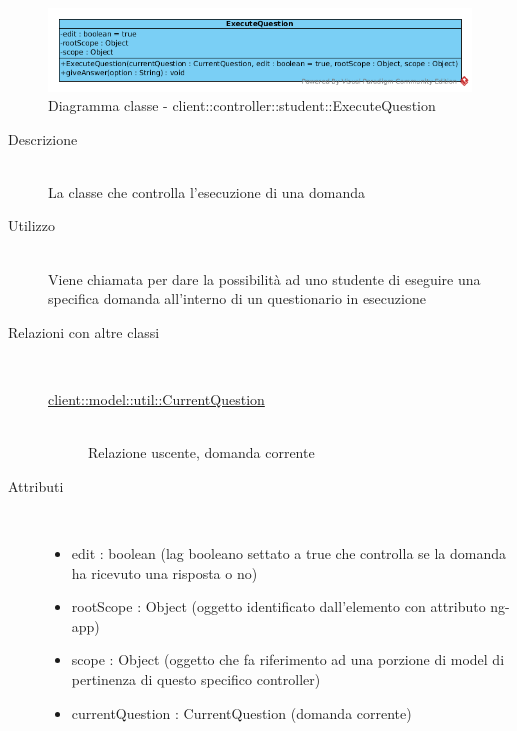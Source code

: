 \vspace{0.5cm}
\hypertarget{client::controller::student::ExecuteQuestion}{}
\begin{center}
			\begin{figure}[H]
				\centering \includegraphics[scale=4, max width=\textwidth, max height=\myheight]{../img/diagrammiClassi/client/controller/student/ExecuteQuestion.png}
				\caption{Diagramma classe - client::controller::student::ExecuteQuestion}
			\end{figure}
		\end{center}\begin{description}
\item[Descrizione] \hfill \\
 La classe che controlla l'esecuzione di una domanda 
\item[Utilizzo] \hfill \\
 Viene chiamata per dare la possibilità ad uno studente di eseguire una specifica domanda all'interno di un questionario in esecuzione
\item[Relazioni con altre classi] \hfill \\
 \vspace{-7mm}
\begin{description}
\item[\hyperlink{client::model::util::CurrentQuestion}{client::model::util::CurrentQuestion}] \hfill \\
 Relazione uscente, domanda corrente
\end{description}

\item[Attributi] \hfill \\
 \vspace{-7mm}
\begin{itemize}
\item edit : boolean (lag booleano settato a true che controlla se la domanda ha ricevuto una risposta o no)
\item rootScope : Object (oggetto identificato dall’elemento con attributo ng-app)
\item scope : Object (oggetto che fa riferimento ad una porzione di model di pertinenza di questo specifico controller)
\item currentQuestion : CurrentQuestion  (domanda corrente)
\end{itemize}


\end{description}
